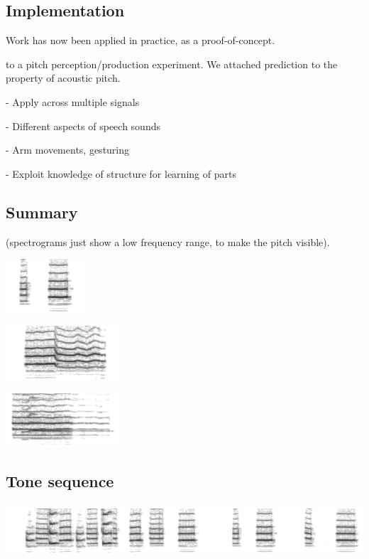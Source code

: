 \subsection{Implementation}

Work has now been applied in practice, as a proof-of-concept.

 to a pitch
perception/production experiment.  We attached prediction to the
property of acoustic pitch.


- Apply across multiple signals

- Different aspects of speech sounds

- Arm movements, gesturing

- Exploit knowledge of structure for learning of parts


\subsection{Summary}

(spectrograms just show a low frequency range, to make the pitch visible).

\includegraphics[height=2cm]{images/chico-output-separate-high-low}

\includegraphics[height=2cm]{images/chico-output-pair-high-low}

\includegraphics[height=2cm]{images/chico-output-ohm}

\subsection{Tone sequence}

\includegraphics[height=2cm]{images/chico-separate-begin}

